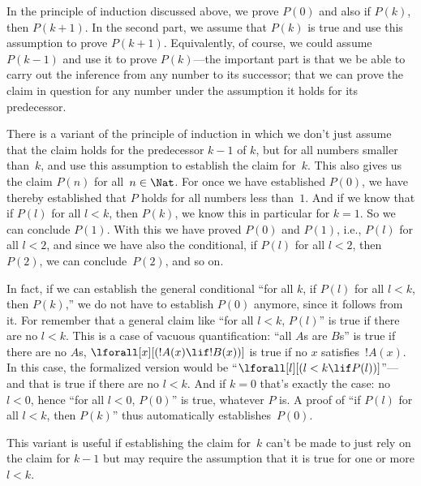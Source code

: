 \documentclass[../../../include/open-logic-section]{subfiles}
\begin{document}


In the principle of induction discussed above, we prove $P(0)$ and
also if $P(k)$, then $P(k+1)$.  In the second part, we assume that
$P(k)$ is true and use this assumption to prove $P(k+1)$.
Equivalently, of course, we could assume $P(k-1)$ and use it to prove
$P(k)$---the important part is that we be able to carry out the
inference from any number to its successor; that we can prove the
claim in question for any number under the assumption it holds for its
predecessor.

There is a variant of the principle of induction in which we don't
just assume that the claim holds for the predecessor $k-1$ of $k$, but
for all numbers smaller than~$k$, and use this assumption to establish
the claim for~$k$. This also gives us the claim $P(n)$ for all~$n \in
\Nat$.  For once we have established $P(0)$, we have thereby
established that $P$ holds for all numbers less than~$1$.  And if we
know that if $P(l)$ for all $l<k$, then $P(k)$, we know this in
particular for $k=1$.  So we can conclude $P(1)$.  With this we have
proved $P(0)$ and $P(1)$, i.e., $P(l)$ for all $l<2$, and since
we have also the conditional, if $P(l)$ for all $l<2$, then $P(2)$, we
can conclude~$P(2)$, and so on.

In fact, if we can establish the general conditional ``for all $k$, if
$P(l)$ for all $l<k$, then $P(k)$,'' we do not have to establish
$P(0)$ anymore, since it follows from it.  For remember that a general
claim like ``for all $l<k$, $P(l)$'' is true if there are no $l<k$.
This is a case of vacuous quantification: ``all $A$s are $B$s'' is
true if there are no $A$s, $\lforall[x][(!A(x) \lif !B(x))]$ is true
if no $x$ satisfies~$!A(x)$. In this case, the formalized version
would be ``$\lforall[l][(l < k \lif P(l))]$''---and that is true if
there are no $l < k$.  And if $k=0$ that's exactly the case: no $l<0$,
hence ``for all $l<0$, $P(0)$'' is true, whatever $P$ is.  A proof of
``if $P(l)$ for all $l<k$, then $P(k)$'' thus automatically
establishes~$P(0)$.

This variant is useful if establishing the claim for~$k$ can't be made
to just rely on the claim for $k-1$ but may require the assumption
that it is true for one or more $l<k$.  
\end{document}
